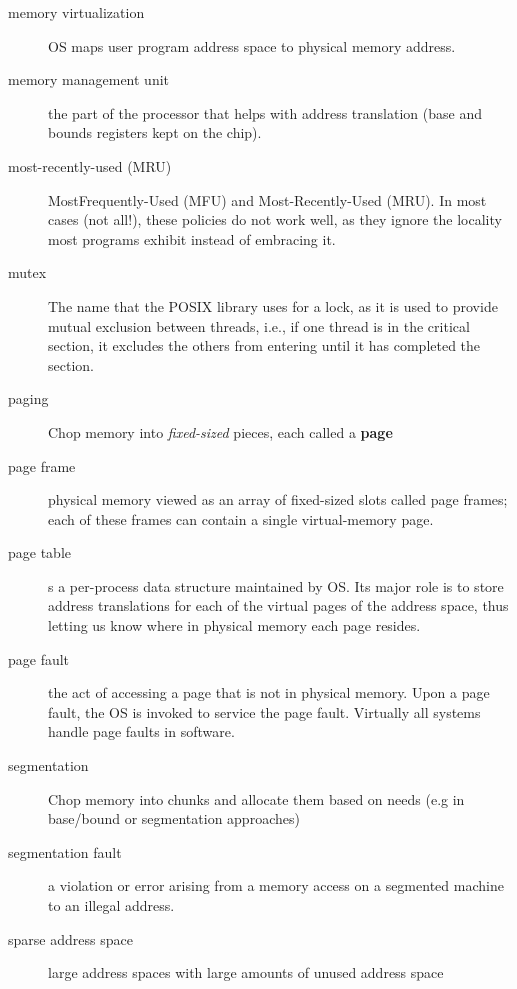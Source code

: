 \begin{description}
\item[memory virtualization] OS maps user program address space to physical memory address.

\item[memory management unit] the part of the processor that helps with address translation (base and bounds registers kept on the chip).

\item[most-recently-used (MRU)] MostFrequently-Used (MFU) and Most-Recently-Used (MRU). In most cases (not all!), these policies do not work well, as they ignore the locality most programs exhibit instead of embracing it.

\item[mutex] The name that the POSIX library uses for a lock, as it is used to provide mutual exclusion between threads, i.e., if one thread is in the critical section, it excludes the others from entering until it has completed the section.

\item[paging] Chop memory into \emph{fixed-sized} pieces, each called a \textbf{page}

\item[page frame] physical memory viewed as an array of fixed-sized slots called page frames; each of these frames can contain a single virtual-memory page.

\item[page table] s a per-process data structure maintained by OS.  Its major role is to store address translations for each of the virtual pages of the address space, thus letting us know where in physical memory each page resides.

\item[page fault] the act of accessing a page that is not in physical memory.  Upon a page fault, the OS is invoked to service the page fault.  Virtually all systems handle page faults in software.

\item[segmentation] Chop memory into  chunks and allocate them based on needs (e.g in base/bound or segmentation approaches)

\item[segmentation fault] a violation or error arising from a memory access on a segmented machine to an illegal address.

\item[sparse address space] large address spaces with large amounts of unused address space


\end{description}
